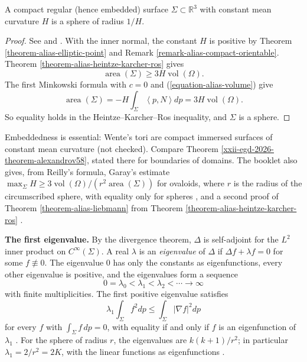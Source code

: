 \begin{theorem}[Alexandrov]
\label{theorem-alias-alexandrov}
A compact regular (hence embedded) surface
$\Sigma\subset\mathbb{R}^3$ with constant
mean curvature $H$ is a sphere of radius
$1/H$.
\end{theorem}

\begin{proof}
See \cite[Theorem 4.9,
pp.~42--43]{alias2006analisis} and
\cite{alexandrov1958uniqueness}. With the
inner normal, the constant $H$ is positive
by Theorem
\ref{theorem-alias-elliptic-point} and
Remark
\ref{remark-alias-compact-orientable}.
Theorem
\ref{theorem-alias-heintze-karcher-ros}
gives
$$
\operatorname{area}(\Sigma)\geq
3H\operatorname{vol}(\Omega).
$$
The first Minkowski formula with $c=0$
and (\ref{equation-alias-volume}) give
$$
\operatorname{area}(\Sigma)
=-H\int_\Sigma\left\langle{} p,N
\right\rangle{}dp
=3H\operatorname{vol}(\Omega).
$$
So equality holds in the
Heintze--Karcher--Ros inequality, and
$\Sigma$ is a sphere.
\end{proof}

Embeddedness is essential: Wente's tori
are compact immersed surfaces of constant
mean curvature (not checked). Compare
Theorem
\ref{xxii-egd-2026-theorem-alexandrov58},
stated there for boundaries of domains.
The booklet also gives, from Reilly's
formula, Garay's estimate
$\max_\Sigma H\geq 3\operatorname{vol}
(\Omega)/(r^2\operatorname{area}(\Sigma))$
for ovaloids, where $r$ is the radius of
the circumscribed sphere, with equality
only for spheres \cite[Theorem 4.6,
p.~38]{alias2006analisis}, and a second
proof of Theorem
\ref{theorem-alias-liebmann} from
Theorem
\ref{theorem-alias-heintze-karcher-ros}
\cite[Theorem 4.10,
pp.~43--44]{alias2006analisis}.

\medskip\noindent
{\bf The first eigenvalue.}
By the divergence theorem, $\Delta$ is
self-adjoint for the $L^2$ inner product
on $C^\infty(\Sigma)$. A real $\lambda$ is
an \emph{eigenvalue} of $\Delta$ if
$\Delta f+\lambda f=0$ for some
$f\not\equiv 0$. The eigenvalue $0$ has
only the constants as eigenfunctions,
every other eigenvalue is positive, and
the eigenvalues form a sequence
$$
0=\lambda_0<\lambda_1<\lambda_2<\cdots
\to\infty
$$
with finite multiplicities. The first
positive eigenvalue satisfies
\begin{equation}
\label{equation-alias-rayleigh}
\lambda_1\int_\Sigma f^2dp
\leq\int_\Sigma|\nabla f|^2dp
\end{equation}
for every $f$ with $\int_\Sigma f\,dp=0$,
with equality if and only if $f$ is an
eigenfunction of $\lambda_1$
\cite[Section 5.1,
pp.~45--47]{alias2006analisis}. For the
sphere of radius $r$, the eigenvalues
are $k(k+1)/r^2$; in particular
$\lambda_1=2/r^2=2K$, with the linear
functions as eigenfunctions
\cite[Example 5.3,
pp.~47--49]{alias2006analisis}.

